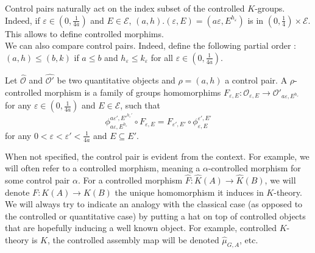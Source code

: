 Control pairs naturally act on the index subset of the controlled $K$-groups. Indeed, if $\varepsilon\in (0,\frac{1}{4a})$ and $E\in\mathcal E$, $(a,h).(\varepsilon,E)= (a\varepsilon,E^{h_\varepsilon})$ is in $(0,\frac{1}{4})\times\mathcal E$. This allows to define controlled morphims.\\

We can also compare control pairs. Indeed, define the following partial order : $(a,h) \leq (b,k)$ if $a \leq b$ and $h_\varepsilon\leq k_\varepsilon$ for all $\varepsilon\in (0,\frac{1}{4a})$.\\ 

\begin{definition}
Let $\hat{\mathcal O}$ and $\hat{\mathcal O'}$ be two quantitative objects and $\rho=(a,h)$ a control pair. A $\rho$-controlled morphism is a family of groups homomorphims $F_{\varepsilon, E} : \mathcal O_{\varepsilon, E} \rightarrow \mathcal{ O'}_{a\varepsilon, E^{h_\varepsilon}}$ for any $\varepsilon\in(0,\frac{1}{4a})$ and $E\in\mathcal E$, such that
\[\phi^{a\varepsilon',E'^{h_\varepsilon'}}_{a\varepsilon,E^{h_\varepsilon}} \circ F_{\varepsilon, E} =F_{\varepsilon',E'} \circ \phi_{\varepsilon,E}^{\varepsilon',E'}\] for any $0<\varepsilon<\varepsilon'<\frac{1}{4a}$ and $E\subseteq E'$.
\end{definition}

\begin{rk}
When not specified, the control pair is evident from the context. For example, we will often refer to a controlled morphism, meaning a $\alpha$-controlled morphism for some control pair $\alpha$. For a controlled morphism $\hat F : \hat K(A)\rightarrow \hat K(B)$, we will denote $F:K(A)\rightarrow K(B)$ the unique homomorphism it induces in $K$-theory. We will always try to indicate an analogy with the classical case (as opposed to the controlled or quantitative case) by putting a hat on top of controlled objects that are hopefully inducing a well known object. For example, controlled $K$-theory is $\hat K$, the controlled assembly map will be denoted $\hat \mu_{G,A}$, etc.\\
\end{rk}

